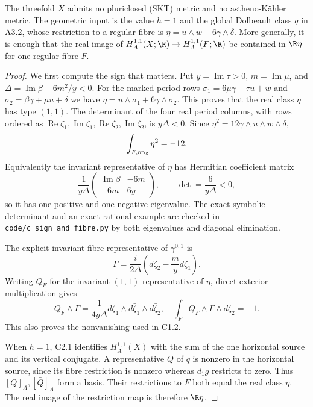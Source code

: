 \begin{proposition}\label{inv:C3.7}
The threefold $X$ admits no pluriclosed (SKT) metric and no
astheno-K\"ahler metric.  The geometric input is the value $h=1$
and the global Dolbeault class $q$ in A3.2, whose restriction to a
regular fibre is $\eta=u\wedge w+6\gamma\wedge\delta$.
More generally, it is enough that the real image of
$H_A^{1,1}(X;\R)\to H_A^{1,1}(F;\R)$ be contained in
$\R\eta$ for one regular fibre $F$.
\end{proposition}
\begin{proof}
We first compute the sign that matters.  Put
$y=\operatorname{Im}\tau>0$, $m=\operatorname{Im}\mu$, and
$\Delta=\operatorname{Im}\beta-6m^2/y<0$.
For the marked period rows
$\sigma_1=6\mu\gamma+\tau u+w$ and
$\sigma_2=\beta\gamma+\mu u+\delta$ we have
$\eta=u\wedge\sigma_1+6\gamma\wedge\sigma_2$.
This proves that the real class $\eta$ has type $(1,1)$.
The determinant of the four real period columns, with rows ordered
as $\operatorname{Re}\zeta_1,\operatorname{Im}\zeta_1,
\operatorname{Re}\zeta_2,\operatorname{Im}\zeta_2$, is
$y\Delta<0$.  Since $\eta^2=12\gamma\wedge u\wedge w\wedge\delta$,
\begin{equation}\label{inv:eq:C-eta-negative}
\int_{F,\mathrm{or}_{\C}}\eta^2=-12.
\end{equation}
Equivalently the invariant representative of $\eta$ has Hermitian
coefficient matrix
\[
\frac1{y\Delta}
\begin{pmatrix}\operatorname{Im}\beta&-6m\\-6m&6y\end{pmatrix},
\qquad \det=\frac6{y\Delta}<0,
\]
so it has one positive and one negative eigenvalue.  The exact
symbolic determinant and an exact rational example are checked in
\texttt{code/c\_sign\_and\_fibre.py} by both eigenvalues and
diagonal elimination.

The explicit invariant fibre representative of $\gamma^{0,1}$ is
\[
\Gamma=\frac{i}{2\Delta}
\left(d\bar\zeta_2-\frac myd\bar\zeta_1\right).
\]
Writing $Q_F$ for the invariant $(1,1)$ representative of $\eta$,
direct exterior multiplication gives
\[
Q_F\wedge\Gamma=
\frac1{4y\Delta}
d\zeta_1\wedge d\bar\zeta_1\wedge d\bar\zeta_2,
\quad
\int_FQ_F\wedge\Gamma\wedge d\zeta_2=-1.
\]
This also proves the nonvanishing used in C1.2.

When $h=1$, C2.1 identifies $H_A^{1,1}(X)$ with the sum of the
one horizontal source and its vertical conjugate.  A representative
$Q$ of $q$ is nonzero in the horizontal source, since its fibre
restriction is nonzero whereas $d_1g$ restricts to zero.  Thus
$[Q]_A,[\bar Q]_A$ form a basis.  Their restrictions to $F$ both
equal the real class $\eta$.  The real image of the restriction map
is therefore $\R\eta$.


\end{proof}
